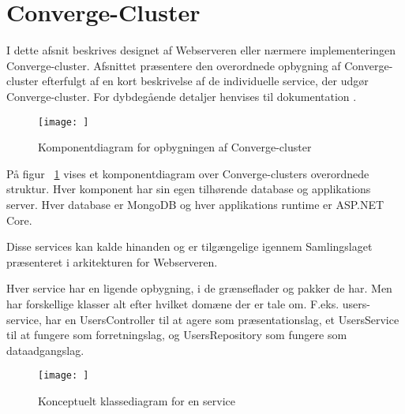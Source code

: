 \section{Converge-Cluster}

I dette afsnit beskrives designet af Webserveren eller nærmere implementeringen Converge-cluster. Afsnittet præsentere den overordnede opbygning af Converge-cluster efterfulgt af en kort beskrivelse af de individuelle service, der udgør Converge-cluster. For dybdegående detaljer henvises til dokumentation .


\begin{figure}
  \begin{small}
    \begin{center}
      \texttt{[image: ]}
    \end{center}
    \caption{Komponentdiagram for opbygningen af Converge-cluster}
    \label{fig:component-converge-cluster}
  \end{small}
\end{figure}

På figur ~\ref{fig:component-converge-cluster} vises et komponentdiagram over Converge-clusters overordnede struktur. Hver komponent har sin egen tilhørende database og applikations server. Hver database er MongoDB og hver applikations runtime er ASP.NET Core.

Disse services kan kalde hinanden og er tilgængelige igennem Samlingslaget præsenteret i arkitekturen for Webserveren. 

Hver service har en ligende opbygning, i de grænseflader og pakker de har. Men har forskellige klasser alt efter hvilket domæne der er tale om. F.eks. users-service, har en UsersController til at agere som præsentationslag, et UsersService til at fungere som forretningslag, og UsersRepository som fungere som dataadgangslag.


\begin{figure}
  \begin{small}
    \begin{center}
      \texttt{[image: ]}
    \end{center}
    \caption{Konceptuelt klassediagram for en service}
    \label{fig:conceptual-class-service}
  \end{small}
\end{figure}

